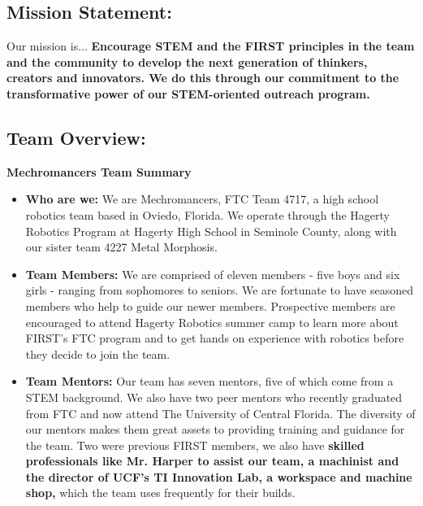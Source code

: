 \subsection*{\textbf{\Huge Mission Statement:}}
\vspace{.2cm}
\setlength{\parindent}{.25in} 

\large{Our mission is...}
\newline 
\textbf{Encourage STEM and the FIRST principles in the team and the community to develop the next generation of thinkers, creators and innovators. We do this through our commitment to the transformative power of our STEM-oriented outreach program.}

\subsection*{\textbf{\Huge Team Overview:}}
\vspace{.2cm}
\setlength{\parindent}{.25in} 

\textbf{\Large Mechromancers Team Summary}

\begin{itemize}
 \item \textbf{Who are we:} We are Mechromancers, FTC Team 4717, a high school robotics team based in Oviedo, Florida. We operate through the Hagerty Robotics Program at Hagerty High School in Seminole County, along with our sister team 4227 Metal Morphosis.
 \item \textbf{Team Members:}  We are comprised of eleven members -  five boys and six girls - ranging from sophomores to seniors. We are fortunate to have seasoned members who help to guide our newer members. Prospective members are encouraged to attend Hagerty Robotics summer camp to learn more about FIRST’s FTC program and to get hands on experience with robotics before they decide to join the team. 
 \item \textbf{Team Mentors:} Our team has seven mentors, five of which come from a STEM background. We also have two peer mentors who recently graduated from FTC and now attend The University of Central Florida. The diversity of our mentors makes them great assets to providing training and guidance for the team. Two were previous FIRST members, we also have \textbf{skilled professionals like Mr. Harper to assist our team, a machinist and the director of UCF's TI Innovation Lab, a workspace and machine shop,} which the team uses frequently for their builds.
\end{itemize}

